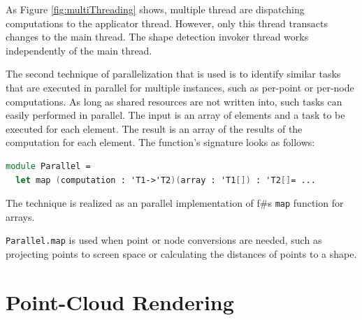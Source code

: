 As Figure \ref{fig:multiThreading} shows, multiple thread are dispatching computations to the applicator thread. However, only this thread transacts changes to the main thread. The shape detection invoker thread works independently of the main thread. 


The second technique of parallelization that is used is to identify similar tasks that are executed in parallel for multiple instances, such as per-point or per-node computations. As long as shared resources are not written into, such tasks can easily performed in parallel. The input is an array of elements and a task to be executed for each element. The result is an array of the results of the computation for each element. The function's signature looks as follows: 
\\
\begin{lstlisting}[language = FSharp]
module Parallel = 
  let map (computation : 'T1->'T2)(array : 'T1[]) : 'T2[]= ...
\end{lstlisting}
The technique is realized as an parallel implementation of f\#s \verb|map| function for arrays. 

\verb|Parallel.map| is used when point or node conversions are needed, such as projecting points to screen space or calculating the distances of points to a shape. 


\section{Point-Cloud Rendering}

